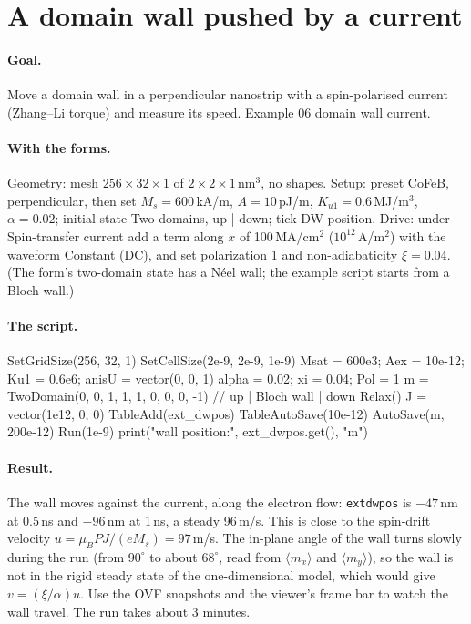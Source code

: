 \documentclass[11pt,a4paper,oneside]{book}
\newcommand{\code}[1]{\texttt{#1}}
\renewcommand{\_}{\textunderscore\allowbreak}
\newcommand{\menu}[1]{\textsf{#1}}
\begin{document}
\section{A domain wall pushed by a current}

\paragraph{Goal.} Move a domain wall in a perpendicular nanostrip with a spin-polarised current (Zhang--Li
torque) and measure its speed. Example \menu{06 domain wall current}.

\paragraph{With the forms.} \menu{Geometry}: mesh $256\times32\times1$ of $2\times2\times1$\,nm$^3$, no shapes.
\menu{Setup}: preset \menu{CoFeB, perpendicular}, then set $M_s = 600$\,kA/m, $A = 10$\,pJ/m,
$K_{u1} = 0.6$\,MJ/m$^3$, $\alpha = 0.02$; initial state \menu{Two domains, up | down}; tick \menu{DW position}.
\menu{Drive}: under \menu{Spin-transfer current} add a term along $x$ of 100\,MA/cm$^2$
($10^{12}$\,A/m$^2$) with the waveform \menu{Constant (DC)}, and set polarization 1 and non-adiabaticity
$\xi = 0.04$. (The form's two-domain state has a N\'eel wall; the example script starts from a Bloch wall.)

\paragraph{The script.}
\begin{mxcode}
SetGridSize(256, 32, 1)
SetCellSize(2e-9, 2e-9, 1e-9)
Msat = 600e3; Aex = 10e-12; Ku1 = 0.6e6; anisU = vector(0, 0, 1)
alpha = 0.02; xi = 0.04; Pol = 1
m = TwoDomain(0, 0, 1,  1, 1, 0,  0, 0, -1)   // up | Bloch wall | down
Relax()
J = vector(1e12, 0, 0)
TableAdd(ext_dwpos)
TableAutoSave(10e-12)
AutoSave(m, 200e-12)
Run(1e-9)
print("wall position:", ext_dwpos.get(), "m")
\end{mxcode}

\paragraph{Result.} The wall moves against the current, along the electron flow: \code{ext\_dwpos} is
$-47$\,nm at 0.5\,ns and $-96$\,nm at 1\,ns, a steady 96\,m/s. This is close to the spin-drift velocity
$u = \mu_B P J/(eM_s) = 97$\,m/s. The in-plane angle of the wall turns slowly during the run (from $90^\circ$ to
about $68^\circ$, read from $\langle m_x\rangle$ and $\langle m_y\rangle$), so the wall is not in the
rigid steady state of the one-dimensional model, which would give $v = (\xi/\alpha)u$. Use the OVF snapshots
and the viewer's frame bar to watch the wall travel. The run takes about 3 minutes.
\end{document}
